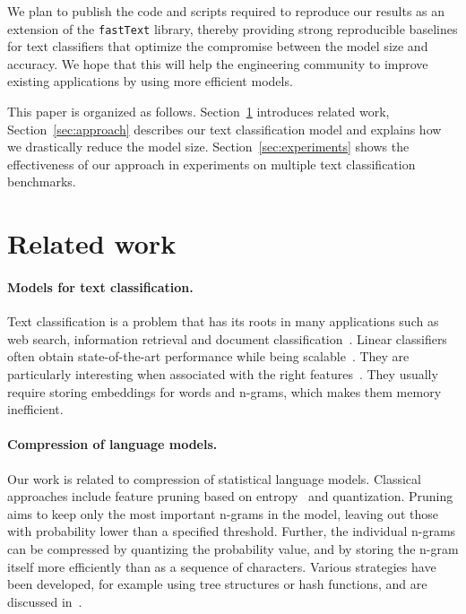 We plan to publish the code and scripts required to reproduce our results as an extension of the \texttt{fastText} library, thereby providing strong reproducible baselines for text classifiers that optimize the compromise between the model size and accuracy. We hope that this will help the engineering community to improve existing applications by using more efficient models.

This paper is organized as follows. Section~\ref{sec:related} introduces related work, Section~\ref{sec:approach} describes our text classification model and explains how we drastically reduce the model size. Section~\ref{sec:experiments} shows the effectiveness of our approach in experiments on multiple text classification benchmarks. 

\section{Related work}
\label{sec:related}

\paragraph{Models for text classification.} Text classification is a problem that has its roots in many applications such as web search, information retrieval and document classification~\citep{deerwester1990indexing,pang2008opinion}.  Linear classifiers often obtain state-of-the-art performance while being scalable~\citep{A14,joachims1998text,J16,mccallum1998comparison}.  They are particularly interesting when associated with the right features~\citep{W12}. They usually require storing embeddings for words and n-grams, which makes them memory inefficient.

\paragraph{Compression of language models.} Our work is related to compression of statistical language models. Classical approaches include feature pruning based on entropy~\citep{stolcke2000entropy} and quantization. Pruning aims to keep only the most important n-grams in the model, leaving out those with probability lower than a specified threshold. Further, the individual n-grams can be compressed by quantizing the probability value, and by storing the n-gram itself more efficiently than as a sequence of characters. Various strategies have been developed, for example using tree structures or hash functions, and are discussed in~\citep{talbot2008randomized}.

